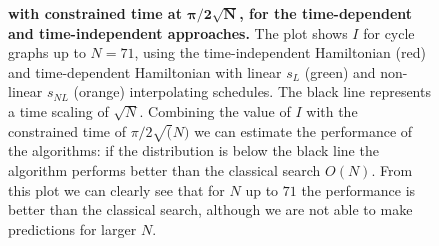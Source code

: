 
\begin{figure}[ht]
  \centering
  \caption{\textbf{ with constrained time at $\bm{\pi/2\sqrt{N}}$, for the time-dependent and time-independent approaches.} The plot shows $I$ for cycle graphs up to $N=71$, using the time-independent Hamiltonian (red) and time-dependent Hamiltonian with linear $s_L$ (green) and non-linear $s_{NL}$ (orange) interpolating schedules. The black line represents a time scaling of $\sqrt{N}$. Combining the value of $I$ with the constrained time of $\pi/2\sqrt(N)$ we can estimate the performance of the algorithms: if the distribution is below the black line the algorithm performs better than the classical search $O(N)$. From this plot we can clearly see that for $N$ up to $71$ the performance is better than the classical search, although we are not able to make predictions for larger $N$.}
  \label{fig:delta_increasing_time}
\end{figure}
